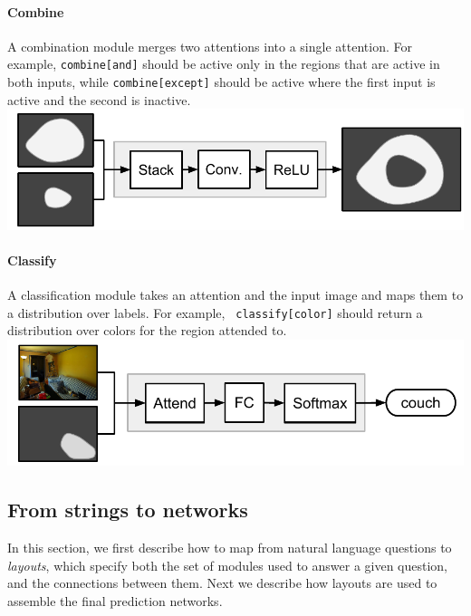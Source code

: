\documentclass[10pt,twocolumn,letterpaper]{article}
\begin{document}
\paragraph{Combine}

A combination module  merges two attentions into a single
attention. For example, {\small\tt combine[and]} should be active only in the
regions that are active in both inputs, while {\small\tt{combine[except]}}
should be active where the first input is active and the second is
inactive.\\[1em] 
\includegraphics[width=\columnwidth]{fig/combine}

\paragraph{Classify}

A classification module  takes an attention and the input
image and maps them to a distribution over labels. For example, {\small\tt
classify[color]} should return a distribution over colors for the region
attended to.\\[1em]
\includegraphics[width=\columnwidth]{fig/classify}

\subsection{From strings to networks}

In this section, we first describe how to map from natural language questions to
\emph{layouts}, which specify both the set of modules used to answer a given
question, and the connections between them. Next we describe how layouts are
used to assemble the final prediction networks.
\end{document}
